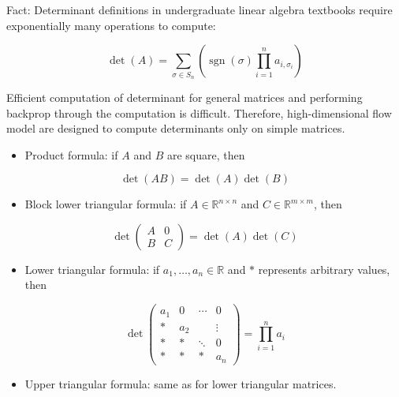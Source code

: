 \begin{concept}
    Fact: Determinant definitions in undergraduate linear algebra textbooks require exponentially many operations to compute:

    $$
    \operatorname{det}(A)=\sum_{\sigma \in S_{n}}\left(\operatorname{sgn}(\sigma) \prod_{i=1}^{n} a_{i, \sigma_{i}}\right)
    $$

    Efficient computation of determinant for general matrices and performing backprop through the computation is difficult. Therefore, high-dimensional flow model are designed to compute determinants only on simple matrices.

    \begin{itemize}
        \item Product formula: if $A$ and $B$ are square, then
    \end{itemize}

    $$
    \operatorname{det}(A B)=\operatorname{det}(A) \operatorname{det}(B)
    $$

    \begin{itemize}
        \item Block lower triangular formula: if $A \in \mathbb{R}^{n \times n}$ and $C \in \mathbb{R}^{m \times m}$, then
    \end{itemize}

    $$
    \operatorname{det}\left(\begin{array}{ll}
    A & 0 \\
    B & C
    \end{array}\right)=\operatorname{det}(A) \operatorname{det}(C)
    $$

    \begin{itemize}
        \item Lower triangular formula: if $a_{1}, \ldots, a_{n} \in \mathbb{R}$ and $*$ represents arbitrary values, then
    \end{itemize}

    $$
    \operatorname{det}\left(\begin{array}{cccc}
    a_{1} & 0 & \cdots & 0 \\
    * & a_{2} & & \vdots \\
    * & * & \ddots & 0 \\
    * & * & * & a_{n}
    \end{array}\right)=\prod_{i=1}^{n} a_{i}
    $$

    \begin{itemize}
        \item Upper triangular formula: same as for lower triangular matrices.
    \end{itemize}
\end{concept}

